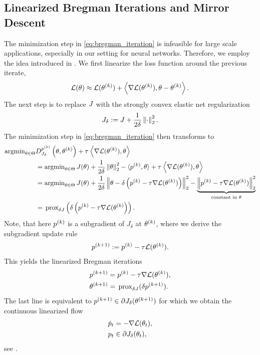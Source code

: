 \subsection{Linearized Bregman Iterations and Mirror Descent}
%
The minimization step in \cref{eq:bregman_iteration} is infeasible for large scale applications, especially in our setting for neural networks. Therefore, we employ the idea introduced in \cite{yin2008bregman, cai2009convergence}. We first linearize the loss function around the previous iterate,
%
\begin{align*}
\mathcal{L}(\theta) \approx \mathcal{L}(\theta^{(k)}) + 
\left\langle \nabla\mathcal{L}(\theta^{(k)}), \theta - \theta^{(k)}
\right\rangle.
\end{align*} 
%
The next step is to replace $J$ with the strongly convex elastic net regularization%
\begin{align}\label{eq:elastic_net}
J_\delta:= J + \frac{1}{2\delta}\left\|\cdot\right\|^2_2.
\end{align}
%
The minimization step in \cref{eq:bregman_iteration} then transforms to
%
\begin{align}\label{eq:LinBregDer}
\argmin_{\param\in\Param} &D^{\sg^{(k)}}_{\func_\delta} \left(\param,\param^{(k)}\right) + \tau^{}\left\langle \nabla\empLoss(\param^{(k)}), \param
\right\rangle\\&= 
\argmin_{\param\in\Param}
J(\param) + \frac{1}{2\delta} \norm{\param}^{2}_2 - 
\langle \sg^{\k k}, \param\rangle +
\tau^{}\left\langle \nabla\empLoss(\param^{(k)}), \param
\right\rangle\nonumber\\
&=
\argmin_{\param\in\Param}
J(\param) + \frac{1}{2\delta} \norm{\param - \delta\left(\sg^{(k)} -\tau \nabla\empLoss(\param^{(k)})\right)}^2_2 - \underbrace{\norm{\sg^{(k)} -\tau \nabla\empLoss(\param^{(k)})}^2_2}_{\text{constant in } \param}\nonumber\\
&=
\prox{\delta \func}\left(\delta\left(\sg^{(k)} -\tau \nabla\empLoss(\param^{(k)}\right)\right).\nonumber%
\end{align}
%
Note, that here $p^{(k)}$ is a subgradient of $J_\delta$ at $\theta^{{(k)}}$, where we derive the subgradient update rule
%
\begin{align*}
p^{(k+1)} := p^{(k)} - \tau \mathcal{L}(\theta^{(k)}).
\end{align*}
%
This yields the linearized Bregman iterations
%
\begin{subequations}\label{eq:lin_bregman_iteration}
\begin{align}
p^{(k+1)} &= p^{(k)} - \tau \nabla\mathcal{L}(\theta^{(k)}),\\
\theta^{(k+1)} &= \,\mathrm{prox}_{\delta J}(\delta p^{(k+1)}).
\end{align}
\end{subequations}
%
%
The last line is equivalent to $p^{(k+1)}\in\partial J_\delta(\theta^{(k+1)})$ for which we obtain the continuous linearized flow
%
\begin{align*}
\dot{p}_t &= -\nabla \mathcal{L}(\theta_t),\\
p_t &\in \partial J_\delta(\theta_t),
\end{align*}
%
see \cite{burger2006nonlinear,burger2007inverse}.
%
%
